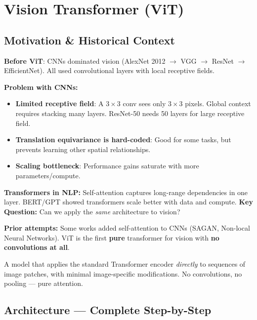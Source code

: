 \section{Vision Transformer (ViT)}

\subsection{Motivation \& Historical Context}
\textbf{Before ViT}: CNNs dominated vision (AlexNet 2012 $\to$ VGG $\to$ ResNet $\to$ EfficientNet). All used convolutional layers with local receptive fields.

\textbf{Problem with CNNs:}
\begin{itemize}
\item \textbf{Limited receptive field}: A $3{\times}3$ conv sees only $3{\times}3$ pixels. Global context requires stacking many layers. ResNet-50 needs 50 layers for large receptive field.
\item \textbf{Translation equivariance is hard-coded}: Good for some tasks, but prevents learning other spatial relationships.
\item \textbf{Scaling bottleneck}: Performance gains saturate with more parameters/compute.
\end{itemize}

\textbf{Transformers in NLP:} Self-attention captures long-range dependencies in one layer. BERT/GPT showed transformers scale better with data and compute. \textbf{Key Question:} Can we apply the \emph{same} architecture to vision?

\textbf{Prior attempts:} Some works added self-attention to CNNs (SAGAN, Non-local Neural Networks). ViT is the first \textbf{pure} transformer for vision with \textbf{no convolutions at all}.

\begin{definition}
A model that applies the standard Transformer encoder \emph{directly} to sequences of image patches, with minimal image-specific modifications. No convolutions, no pooling — pure attention.
\end{definition}

\subsection{Architecture — Complete Step-by-Step}


